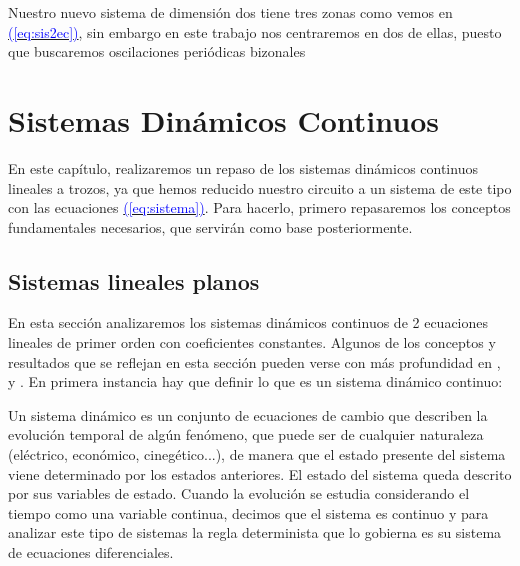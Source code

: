 \documentclass[12pt,a4paper]{report} %
\newcommand{\eref}[1]{\hyperref[#1]{\textcolor{blue}{(\ref*{#1})}}}
\newcommand{\eref}[1]{\hyperref[#1]{\textcolor{blue}{\textit{(\ref*{#1})}}}}
\begin{document}

	
	\vspace{0.5cm}Nuestro nuevo sistema de dimensión dos tiene tres zonas como vemos en \eref{eq:sis2ec}, sin embargo en este trabajo nos centraremos en dos de ellas, puesto que buscaremos oscilaciones periódicas bizonales

	
	\chapter{Sistemas Dinámicos Continuos}
	\label{cap.2}
	
	En este capítulo, realizaremos un repaso de los sistemas dinámicos continuos lineales a trozos, ya que hemos reducido nuestro circuito a un sistema de este tipo con las ecuaciones \eref{eq:sistema}. Para hacerlo, primero repasaremos los conceptos fundamentales necesarios, que servirán como base posteriormente.
	
	\section{Sistemas lineales planos}
	\label{sec:sislinplanos}
	
	En esta sección analizaremos los sistemas dinámicos continuos de 2 ecuaciones lineales de primer orden con coeficientes constantes. Algunos de los conceptos y resultados que se reflejan en esta sección pueden verse con más profundidad en \cite{hirsch}, \cite{simmons} y \cite{zill}.
	En primera instancia hay que definir lo que es un sistema dinámico continuo:
	
	\vspace{0.5cm}Un sistema dinámico es un conjunto de ecuaciones de cambio que describen la evolución temporal de algún fenómeno, que puede ser de cualquier naturaleza (eléctrico, económico, cinegético...), de manera que el estado presente del sistema viene determinado por los estados anteriores. El estado del sistema queda descrito por sus variables de estado. Cuando la evolución se estudia considerando el tiempo como una variable  continua, decimos que el sistema es continuo y para analizar este tipo de sistemas la regla determinista que lo gobierna es su sistema de ecuaciones diferenciales.
	
\end{document}
